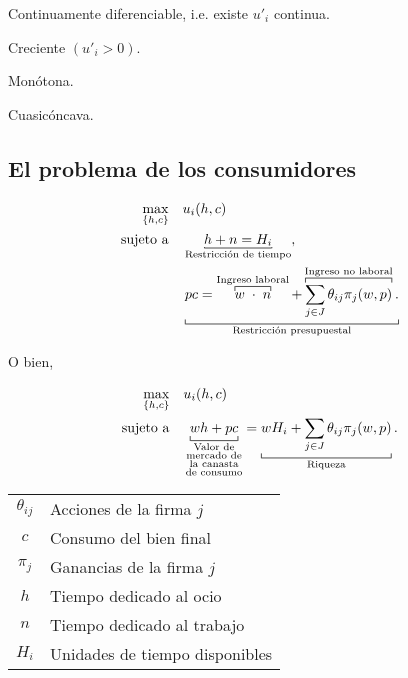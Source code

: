\documentclass[8pt,a4paper]{extarticle}
\begin{document}
\begin{multicols}{3}
\begin{eqlist}
\item Continuamente diferenciable, i.e. existe $u'_i$ continua.
\item Creciente $(u'_i > 0)$.
\item Monótona.
\item Cuasicóncava.
\end{eqlist}

\subsection{El problema de los consumidores}

\begin{equation*}
\begin{aligned}
	\max_{\{h, c\}} \quad & u_i(h, c) \\
	\text{sujeto a} \quad & \underbracket[0.5pt][0.5pt]{h + n = H_i}_{\text{\normalfont Restricción de tiempo}}, \\
						  & \underbracket[0.5pt]{pc = \overbracket[0.5pt]{w \; \cdot \;  n}^{\text{\normalfont Ingreso laboral}} + \overbracket[0.5pt]{\sum_{j \in J} \theta_{ij} \pi_j (w, p)}^{\text{\normalfont Ingreso no laboral}}.}_{\text{\normalfont Restricción presupuestal}}
\end{aligned}
\end{equation*}

O bien,

\begin{equation*}
\begin{aligned}
	\max_{\{h, c\}} \quad & u_i(h, c) \\
	\text{sujeto a} \quad & \underbracket[0.5pt]{wh + pc}_{\substack{\text{\normalfont Valor de} \\ \text{\normalfont mercado de} \\ \text{\normalfont la canasta} \\\text{\normalfont de consumo} }} = \underbracket[0.5pt]{wH_i + \sum_{j \in J} \theta_{ij} \pi_j (w, p)}_{\text{\normalfont Riqueza}}.
\end{aligned}
\end{equation*}

\begin{center}
\begin{tabular}{ c l }
	\hline
	$\theta_{ij}$ & Acciones de la firma $j$ \\
	$c$           & Consumo del bien final \\
	$\pi_j$       & Ganancias de la firma $j$ \\
	$h$           & Tiempo dedicado al ocio \\
	$n$           & Tiempo dedicado al trabajo \\
	$H_i$         & Unidades de tiempo disponibles \\
	\hline
\end{tabular}
\end{center}


\end{multicols}
\end{document}
